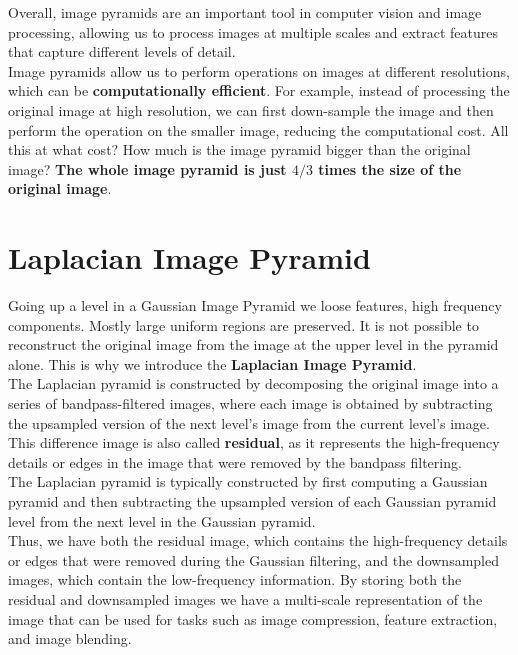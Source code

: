 \documentclass{article}
\begin{document}
Overall, image pyramids are an important tool in computer vision and image processing, allowing us to process images at multiple scales and extract features that capture different levels of detail. \\

Image pyramids allow us to perform operations on images at different resolutions, which can be \textbf{computationally efficient}. For example, instead of processing the original image at high resolution, we can first down-sample the image and then perform the operation on the smaller image, reducing the computational cost. All this at what cost? How much is the image pyramid bigger than the original image? \textbf{The whole image pyramid is just $4/3$ times the size of the original image}. 

\newpage

\section*{Laplacian Image Pyramid}

Going up a level in a Gaussian Image Pyramid we loose features, high frequency components. Mostly large uniform regions are preserved. It is not possible to reconstruct the original image from the image at the upper level in the pyramid alone. This is why we introduce the \textbf{Laplacian Image Pyramid}. \\

The Laplacian pyramid is constructed by decomposing the original image into a series of bandpass-filtered images, where each image is obtained by subtracting the upsampled version of the next level's image from the current level's image. This difference image is also called \textbf{residual}, as it represents the high-frequency details or edges in the image that were removed by the bandpass filtering. \\

The Laplacian pyramid is typically constructed by first computing a Gaussian pyramid and then subtracting the upsampled version of each Gaussian pyramid level from the next level in the Gaussian pyramid. \\

Thus, we have both the residual image, which contains the high-frequency details or edges that were removed during the Gaussian filtering, and the downsampled images, which contain the low-frequency information. By storing both the residual and downsampled images we have a multi-scale representation of the image that can be used for tasks such as image compression, feature extraction, and image blending.
\end{document}
